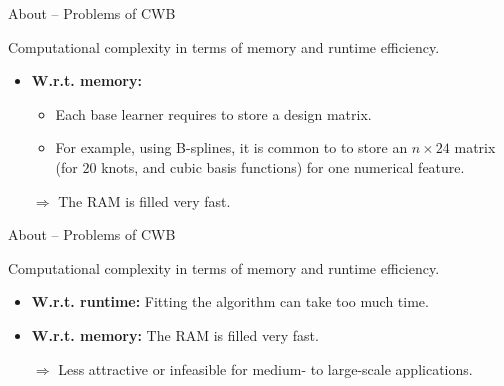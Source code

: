 \documentclass[t,10pt]{beamer}
\begin{document}
\begin{frame}{About -- Problems of CWB}

  Computational complexity in terms of memory and runtime efficiency.
  \begin{itemize}
    \item \textbf{W.r.t. memory:}
    \begin{itemize}
      \item Each base learner requires to store a design matrix.
      \item For example, using B-splines, it is common to to store an $n\times 24$ matrix (for $20$ knots, and cubic basis functions) for one numerical feature.
    \end{itemize}
    \item[] $\Rightarrow$ The RAM is filled very fast.
  \end{itemize}
\end{frame}

\begin{frame}{About -- Problems of CWB}

  Computational complexity in terms of memory and runtime efficiency.
  \begin{itemize}
    \item \textbf{W.r.t. runtime:} Fitting the algorithm can take too much time.
    \item \textbf{W.r.t. memory:} The RAM is filled very fast.
  \end{itemize}
  \begin{itemize}
    \item[$\Rightarrow$] Less attractive or infeasible for medium- to large-scale applications.
  \end{itemize}
\end{frame}
\end{document}
